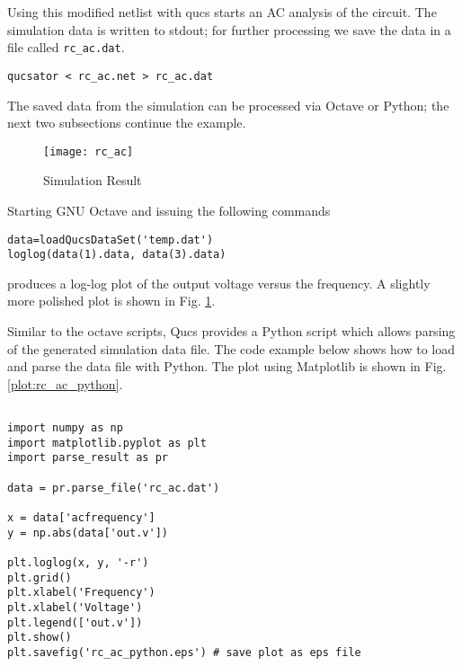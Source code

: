Using this modified netlist with qucs starts an AC analysis of the circuit. The simulation data is written to stdout; for further processing we save the data in a file called \verb+rc_ac.dat+.

\begin{verbatim}
qucsator < rc_ac.net > rc_ac.dat
\end{verbatim}

The saved data from the simulation can be processed via Octave or Python; the next two subsections continue the example.

\begin{figure}[htb]
\begin{center}
  \texttt{[image: rc\_ac]}
  \caption{Simulation Result}
  \label{plot:rc_ac_octave}
\end{center}
\end{figure}





Starting GNU Octave and issuing the following commands

\begin{verbatim}
data=loadQucsDataSet('temp.dat')
loglog(data(1).data, data(3).data)
\end{verbatim}

produces a log-log plot of the output voltage versus the frequency. A slightly more polished plot is shown in Fig. \ref{plot:rc_ac_octave}.



Similar to the octave scripts, Qucs provides a Python script which allows parsing of the generated simulation data file. The code example below shows how to load and parse the data file with Python. The plot using Matplotlib is shown in Fig. \ref{plot:rc_ac_python}.


\begin{verbatim}

import numpy as np
import matplotlib.pyplot as plt
import parse_result as pr

data = pr.parse_file('rc_ac.dat')

x = data['acfrequency']
y = np.abs(data['out.v'])

plt.loglog(x, y, '-r')
plt.grid()
plt.xlabel('Frequency')
plt.xlabel('Voltage')
plt.legend(['out.v'])
plt.show()
plt.savefig('rc_ac_python.eps') # save plot as eps file

\end{verbatim}


